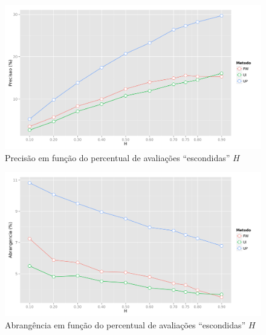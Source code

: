 {\begin{figure}[hp]
    \begin{center}
    \includegraphics[width=1\textwidth]{img/precision_H}
    \end{center}
    \caption{Precisão em função do percentual de avaliações ``escondidas'' $H$}
    \label{fig:precision_H}
\end{figure}


\begin{figure}[hp]
    \begin{center}
    \includegraphics[width=1\textwidth]{img/recall_H}
    \end{center}
    \caption{Abrangência em função do percentual de avaliações ``escondidas'' $H$}
    \label{fig:recall_H}
\end{figure}

}
